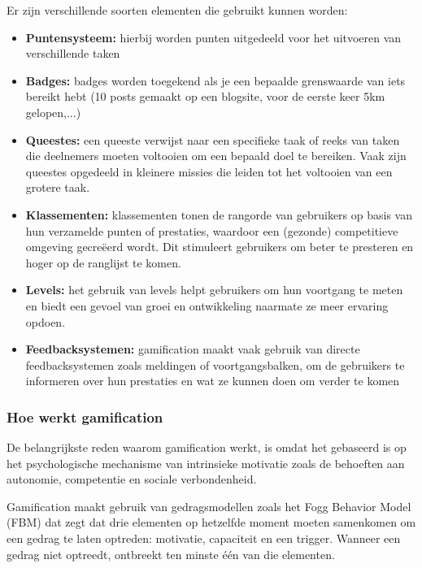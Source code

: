 \documentclass{hogent-article}
\begin{document}
Er zijn verschillende soorten elementen die gebruikt kunnen worden:
\begin{itemize}
    \item \textbf{Puntensysteem:} hierbij worden punten uitgedeeld voor het uitvoeren van verschillende taken \autocite{Kondrat2024}
    \item  \textbf{Badges:} badges worden toegekend als je een bepaalde grenswaarde van iets bereikt hebt (10 posts gemaakt op een blogsite, voor de eerste keer 5km gelopen,...) \autocite{Kondrat2024}
    \item \textbf{Queestes:} een queeste verwijst naar een specifieke taak of reeks van taken die deelnemers moeten voltooien om een bepaald doel te bereiken. Vaak zijn queestes  opgedeeld in kleinere missies die leiden tot het voltooien van een grotere taak. \autocite{Wanasek2023}
    \item \textbf{Klassementen:} klassementen tonen de rangorde van gebruikers op basis van hun verzamelde punten of prestaties, waardoor een (gezonde) competitieve omgeving gecreëerd wordt. Dit stimuleert gebruikers om beter te presteren en hoger op de ranglijst te komen. \autocite{Werbach2012}
    \item \textbf{Levels:} het gebruik van levels helpt gebruikers om hun voortgang te meten en biedt een gevoel van groei en ontwikkeling naarmate ze meer ervaring opdoen. \autocite{Werbach2012}
    \item \textbf{Feedbacksystemen:} gamification maakt vaak gebruik van directe feedbacksystemen zoals meldingen of voortgangsbalken, om de gebruikers te informeren over hun prestaties en wat ze kunnen doen om verder te komen \autocite{Deterding2011}
\end{itemize}

\subsubsection{Hoe werkt gamification}

De belangrijkste reden waarom gamification werkt, is omdat het gebaseerd is op het psychologische mechanisme van intrinsieke motivatie zoals de behoeften aan autonomie, competentie en sociale verbondenheid. \autocite{Ryan2000}

Gamification maakt gebruik van gedragsmodellen zoals het Fogg Behavior Model (FBM) dat zegt dat drie elementen op hetzelfde moment moeten samenkomen om een ​​gedrag te laten optreden: motivatie, capaciteit en een trigger. Wanneer een gedrag niet optreedt, ontbreekt ten minste één van die elementen. \autocite{Fogg_2009}
\end{document}
